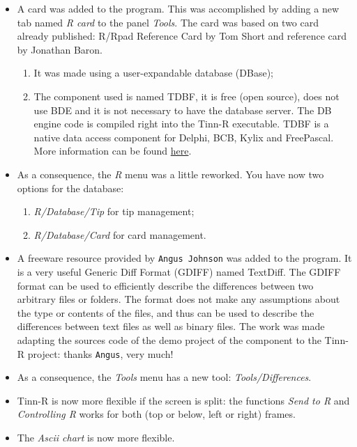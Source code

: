 \begin{itemize}
  \item A \RR{} card was added to the program.
    This was accomplished by adding a new tab
    named \textit{R card} to the panel \textit{Tools}.
    The \RR{} card was based on two \RR{} card already published:
    R/Rpad Reference Card by Tom Short and \RR{} reference card by Jonathan Baron.
    \begin{enumerate}
      \item It was made using a user-expandable database (DBase);
      \item The component used is named TDBF, it is free (open source), does
        not use BDE and it is not necessary to have the database server. The
        DB engine code is compiled right into the Tinn-R executable. TDBF is
        a native data access component for Delphi, BCB, Kylix and FreePascal.
        More information can be found
        \href{https://sourceforge.net/projects/tdbf/}{here}.
    \end{enumerate}
  \item As a consequence, the \textit{R} menu was a little reworked. You
    have now two options for the database:
    \begin{enumerate}
      \item \textit{R/Database/Tip} for tip management;
      \item \textit{R/Database/Card} for \RR{} card management.
    \end{enumerate}
  \item A freeware resource provided by \texttt{Angus Johnson} was added
    to the program. It is a very useful Generic Diff Format (GDIFF)
    named TextDiff. The GDIFF format can be used to efficiently describe
    the differences between two arbitrary files or folders. The format
    does not make any assumptions about the type or contents of the files,
    and thus can be used to describe the differences between text files
    as well as binary files. The work was made adapting the sources code
    of the demo project of the component to the Tinn-R project: thanks
    \texttt{Angus}, very much!
  \item As a consequence, the \textit{Tools} menu has a new tool:
    \textit{Tools/Differences}.
  \item Tinn-R is now more flexible if the screen is split: the
    functions \textit{Send to R} and \textit{Controlling R} works for
    both (top or below, left or right) frames.
  \item The \textit{Ascii chart} is now more flexible.

\end{itemize}
